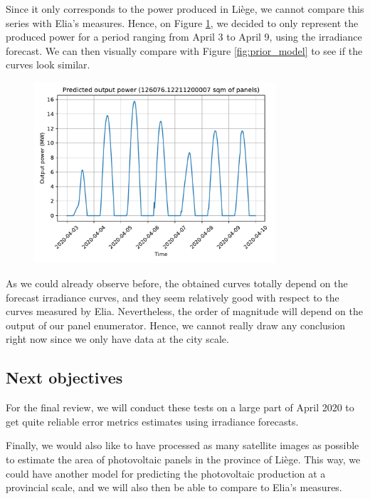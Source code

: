 \documentclass[a4paper, 12pt]{article}
\begin{document}
Since it only corresponds to the power produced in Liège, we cannot compare this series with Elia's measures. Hence, on Figure \ref{fig:solar_liege}, we decided to only represent the produced power for a period ranging from April 3 to April 9, using the irradiance forecast. We can then visually compare with Figure \ref{fig:prior_model} to see if the curves look similar.
\begin{figure}[H]
    \centering
    \includegraphics[width=0.8\textwidth]{resources/pdf/solar_liege.pdf}
    \label{fig:solar_liege}
\end{figure}
As we could already observe before, the obtained curves totally depend on the forecast irradiance curves, and they seem relatively good with respect to the curves measured by Elia. Nevertheless, the order of magnitude will depend on the output of our panel enumerator. Hence, we cannot really draw any conclusion right now since we only have data at the city scale.

\subsection{Next objectives}
For the final review, we will conduct these tests on a large part of April 2020 to get quite reliable error metrics estimates using irradiance forecasts.

Finally, we would also like to have processed as many satellite images as possible to estimate the area of photovoltaic panels in the province of Liège. This way, we could have another model for predicting the photovoltaic production at a provincial scale, and we will also then be able to compare to Elia's measures.
\end{document}
